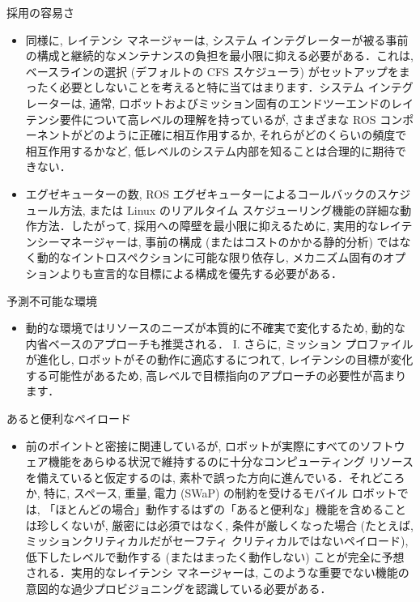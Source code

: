 \begin{frame}{採用の容易さ}
    \begin{itemize}
        \item 同様に, レイテンシ マネージャーは, システム インテグレーターが被る事前の構成と継続的なメンテナンスの負担を最小限に抑える必要がある．これは, ベースラインの選択 (デフォルトの CFS スケジューラ) がセットアップをまったく必要としないことを考えると特に当てはまります．システム インテグレーターは, 通常, ロボットおよびミッション固有のエンドツーエンドのレイテンシ要件について高レベルの理解を持っているが, さまざまな ROS コンポーネントがどのように正確に相互作用するか, それらがどのくらいの頻度で相互作用するかなど, 低レベルのシステム内部を知ることは合理的に期待できない．
    \end{itemize}
\end{frame}

\begin{frame}{}
    \begin{itemize}
        \item エグゼキューターの数, ROS エグゼキューターによるコールバックのスケジュール方法, または Linux のリアルタイム スケジューリング機能の詳細な動作方法．したがって, 採用への障壁を最小限に抑えるために, 実用的なレイテンシーマネージャーは, 事前の構成 (またはコストのかかる静的分析) ではなく動的なイントロスペクションに可能な限り依存し, メカニズム固有のオプションよりも宣言的な目標による構成を優先する必要がある．
    \end{itemize}
\end{frame}

\begin{frame}{予測不可能な環境}
    \begin{itemize}
        \item 動的な環境ではリソースのニーズが本質的に不確実で変化するため, 動的な内省ベースのアプローチも推奨される． I. さらに, ミッション プロファイルが進化し, ロボットがその動作に適応するにつれて, レイテンシの目標が変化する可能性があるため, 高レベルで目標指向のアプローチの必要性が高まります．
    \end{itemize}
\end{frame}

\begin{frame}{あると便利なペイロード}
    \begin{itemize}
        \item 前のポイントと密接に関連しているが, ロボットが実際にすべてのソフトウェア機能をあらゆる状況で維持するのに十分なコンピューティング リソースを備えていると仮定するのは, 素朴で誤った方向に進んでいる．それどころか, 特に, スペース, 重量, 電力 (SWaP) の制約を受けるモバイル ロボットでは, 「ほとんどの場合」動作するはずの「あると便利な」機能を含めることは珍しくないが, 厳密には必須ではなく, 条件が厳しくなった場合 (たとえば, ミッションクリティカルだがセーフティ クリティカルではないペイロード), 低下したレベルで動作する (またはまったく動作しない) ことが完全に予想される．実用的なレイテンシ マネージャーは, このような重要でない機能の意図的な過少プロビジョニングを認識している必要がある．
    \end{itemize}
\end{frame}

